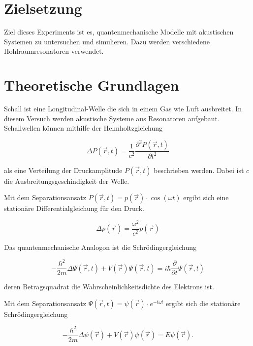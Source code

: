 \section{Zielsetzung}
Ziel dieses Experiments ist es, quantenmechanische Modelle mit akustischen Systemen zu untersuchen und simulieren.
Dazu werden verschiedene Hohlraumresonatoren verwendet.


\section{Theoretische Grundlagen}

\noindent
Schall ist eine Longitudinal-Welle die sich in einem Gas wie Luft ausbreitet.
In diesem Versuch werden akustische Systeme aus Resonatoren aufgebaut.
Schallwellen können mithilfe der Helmholtzgleichung 

\begin{equation*}
    \Delta P(\vec{r},t) = \frac{1}{c^2} \frac{\partial^2 P(\vec{r},t)}{\partial t^2}
\end{equation*}

\noindent
als eine Verteilung der Druckamplitude $P(\vec{r},t)$ beschrieben werden.
Dabei ist $c$ die Ausbreitungsgeschindigkeit der Welle.

\noindent
Mit dem Separationsansatz $P(\vec{r},t) = p(\vec{r}) \cdot \cos(\omega t)$ ergibt sich eine stationäre Differentialgleichung für den Druck.

\begin{equation}
    \Delta p(\vec{r}) = \frac{\omega^2}{c^2} p(\vec{r})
    \label{eqn:helmholtz}
\end{equation}

\noindent
Das quantenmechanische Analogon ist die Schrödingergleichung

\begin{equation*}
    -\frac{\hbar^2}{2m} \Delta \Psi(\vec{r},t) + V(\vec{r}) \Psi(\vec{r},t) = i\hbar \frac{\partial}{\partial t} \Psi(\vec{r},t)
\end{equation*}

\noindent
deren Betragsquadrat die Wahrscheinlichkeitsdichte des Elektrons ist.

\noindent
Mit dem Separationsansatz $\Psi(\vec{r},t) = \psi(\vec{r}) \cdot e^{-i \omega t}$ ergibt sich die stationäre Schrödingergleichung

\begin{equation}
    -\frac{\hbar^2}{2m} \Delta \psi(\vec{r}) + V(\vec{r}) \psi(\vec{r}) = E \psi(\vec{r}).
    \label{eqn:schroedinger}
\end{equation}

